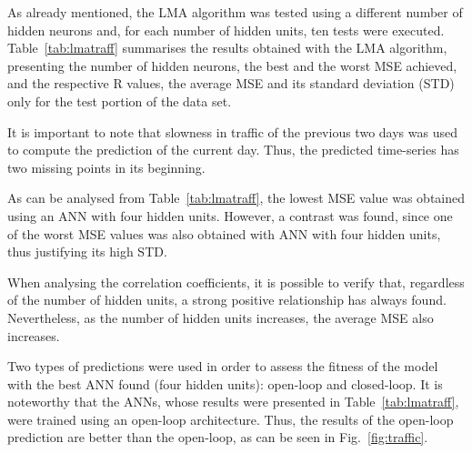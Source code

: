 As already mentioned, the LMA algorithm was tested using a different number of hidden neurons and, for each number of hidden units, ten tests were executed. Table~\ref{tab:lmatraff} summarises the results obtained with the LMA algorithm, presenting the number of hidden neurons, the best and the worst MSE achieved, and the respective R values, the average MSE and its standard deviation (STD) only for the test portion of the data set.

It is important to note that slowness in traffic of the previous two days was used to compute the prediction of the current day. Thus, the predicted time-series has two missing points in its beginning.

As can be analysed from Table~\ref{tab:lmatraff}, the lowest MSE value was obtained using an ANN with four hidden units. However, a contrast was found, since one of the worst MSE values was also obtained with ANN with four hidden units, thus justifying its high STD.

When analysing the correlation coefficients, it is possible to verify that, regardless of the number of hidden units, a strong positive relationship has always found. Nevertheless, as the number of hidden units increases, the average MSE also increases. 

\begin{table}[htbp]
\centering
\caption{Summary of the tests performed with the LMA in the urban traffic in São Paulo -- Brazil -- test data set.}
\label{tab:lmatraff}
\end{table}

Two types of predictions were used in order to assess the fitness of the model with the best ANN found (four hidden units): open-loop and closed-loop. It is noteworthy that the ANNs, whose results were presented in Table~\ref{tab:lmatraff}, were trained using an open-loop architecture. Thus, the results of the open-loop prediction are better than the open-loop, as can be seen in Fig.~\ref{fig:traffic}.


